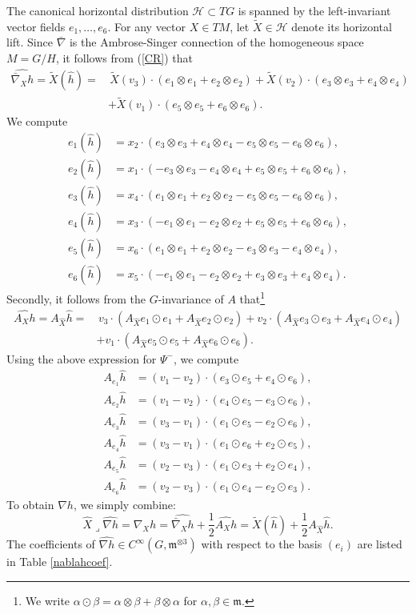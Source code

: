 \documentclass[12pt]{scrartcl}
\theoremstyle{plain}
\theoremstyle{definition}
\renewcommand{\H}{\mathcal{H}}%
\newcommand{\m}{\mathfrak{m}}%
\begin{document}
The canonical horizontal distribution $\H\subset TG$ is spanned by the left-invariant vector fields $e_1,\ldots,e_6$. For any vector $X\in TM$, let $\tilde{X}\in\H$ denote its horizontal lift. Since $\bar\nabla$ is the Ambrose-Singer connection of the homogeneous space $M=G/H$, it follows from (\ref{CR}) that
\begin{align*}
\widehat{\bar\nabla_Xh}=\tilde{X}(\hat h)=&\,\tilde{X}(v_3)\cdot(e_1\otimes e_1+e_2\otimes e_2)+\tilde{X}(v_2)\cdot(e_3\otimes e_3+e_4\otimes e_4)\\
&+\tilde{X}(v_1)\cdot(e_5\otimes e_5+e_6\otimes e_6).
\end{align*}
We compute
\begin{align*}
e_1(\hat h)&=x_2\cdot(e_3\otimes e_3+e_4\otimes e_4-e_5\otimes e_5-e_6\otimes e_6),\\
e_2(\hat h)&=x_1\cdot(-e_3\otimes e_3-e_4\otimes e_4+e_5\otimes e_5+e_6\otimes e_6),\\
e_3(\hat h)&=x_4\cdot(e_1\otimes e_1+e_2\otimes e_2-e_5\otimes e_5-e_6\otimes e_6),\\
e_4(\hat h)&=x_3\cdot(-e_1\otimes e_1-e_2\otimes e_2+e_5\otimes e_5+e_6\otimes e_6),\\
e_5(\hat h)&=x_6\cdot(e_1\otimes e_1+e_2\otimes e_2-e_3\otimes e_3-e_4\otimes e_4),\\
e_6(\hat h)&=x_5\cdot(-e_1\otimes e_1-e_2\otimes e_2+e_3\otimes e_3+e_4\otimes e_4).
\end{align*}
Secondly, it follows from the $G$-invariance of $A$ that\footnote{We write $\alpha\odot\beta=\alpha\otimes\beta+\beta\otimes\alpha$ for $\alpha,\beta\in\m$.}
\begin{align*}
\widehat{A_Xh}=A_{\hat X}\hat h=&\,v_3\cdot(A_{\hat X}e_1\odot e_1+A_{\hat X}e_2\odot e_2)+v_2\cdot(A_{\hat X}e_3\odot e_3+A_{\hat X}e_4\odot e_4)\\
&+v_1\cdot(A_{\hat X}e_5\odot e_5+A_{\hat X}e_6\odot e_6).
\end{align*}
Using the above expression for $\Psi^-$, we compute
\begin{align*}
A_{e_1}\hat h&=(v_1-v_2)\cdot(e_3\odot e_5+e_4\odot e_6),\\
A_{e_2}\hat h&=(v_1-v_2)\cdot(e_4\odot e_5-e_3\odot e_6),\\
A_{e_3}\hat h&=(v_3-v_1)\cdot(e_1\odot e_5-e_2\odot e_6),\\
A_{e_4}\hat h&=(v_3-v_1)\cdot(e_1\odot e_6+e_2\odot e_5),\\
A_{e_5}\hat h&=(v_2-v_3)\cdot(e_1\odot e_3+e_2\odot e_4),\\
A_{e_6}\hat h&=(v_2-v_3)\cdot(e_1\odot e_4-e_2\odot e_3).
\end{align*}
To obtain $\nabla h$, we simply combine:
\[\hat{X}\lrcorner\widehat{\nabla h}=\widehat{\nabla_Xh}=\widehat{\bar\nabla_Xh}+\frac{1}{2}\widehat{A_Xh}=\tilde{X}(\hat h)+\frac{1}{2}A_{\hat X}\hat h.\]
The coefficients of $\widehat{\nabla h}\in C^\infty(G,\m^{\otimes 3})$ with respect to the basis $(e_i)$ are listed in Table \ref{nablahcoef}.
\end{document}
